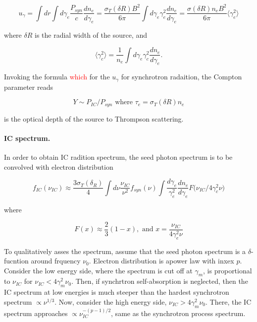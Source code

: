 \documentclass[11pt,a4paper,headinclude=true,DIV=14,BCOR=8mm,chapterprefix,listof=totoc,twoside,openright,abstracton]{scrbook}
\newcommand{\red}[1]{\textcolor{red}{#1}}
\begin{document}
\begin{equation}
    u_{\gamma} = \int dr \int d\gamma_e \frac{P_{syn}}{c}\frac{dn_e}{d\gamma_e} = \frac{\sigma_T (\delta R) B^2}{6\pi} \int d\gamma_e \gamma^2_e \frac{d n_e}{d\gamma_e} = \frac{\sigma (\delta R) n_e B^2}{6\pi}\langle\gamma_e^2\rangle
\end{equation}

where $\delta R$ is the radial width of the source, and 

\begin{equation}
    \langle \gamma_c^2\rangle = \frac{1}{n_e} \int d\gamma_e \gamma_c^2\frac{dn_e}{d\gamma_e}.
\end{equation}

Invoking the formula \red{which} for the $u_{\gamma}$ for synchrotron radaition, the Compton parameter reads 

\begin{equation}
    Y \sim P_{IC} / P_{syn} \text{ where } \tau_e = \sigma_T (\delta R) n_e
\end{equation}

is the optical depth of the source to Thrompson scattering.

\paragraph{IC spectrum.}

In order to obtain IC radition spectrum, the seed photon spectrum is to be convolved with electron distribution \cite{RubikiLightman1979}

\begin{equation}
    f_{IC}(\nu_{IC}) \approx \frac{3\sigma_T (\delta_R)}{4} \int d\nu \frac{\nu_{IC}}{\nu^2}f_{syn}(\nu) \int \frac{d\gamma_e}{\gamma_e^2}\frac{dn_e}{d\gamma_e}F\big( \nu_{IC} / 4 \gamma_c^2\nu \big)
\end{equation}

where 

\begin{equation}
    F(x) \approx \frac{2}{3}(1-x), \text{ and } x = \frac{\nu_{IC}}{4\gamma_e^2\nu}
\end{equation}

To qualitatively asses the spectrum, assume that the seed photon spectrum is a $\delta$-fucntion around frquency $\nu_0$. Electron distribution is apower law with inxex $p$.
Consider the low energy side, where the spectrum is cut off at $\gamma_m$, is proportional to $\nu_{IC}$ for $\nu_{IC} < 4\gamma_m^2\nu_0$. Then, if synchrtron self-absorption is neglected, then the IC spectrum at low energies is much steeper than the hardest synchrotron spectrum $\propto\nu^{1/3}$.
Now, consider the high energy side, $\nu_{IC} > 4 \gamma_m^2\nu_0$. There, the IC spectrum approaches $\propto \nu_{IC}^{-(p-1)/2}$, same as the synchrotron process spectrum.
\end{document}
